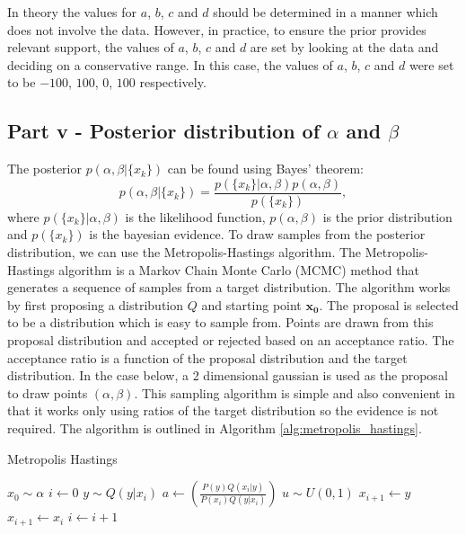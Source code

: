 \documentclass[11pt]{article}
\begin{document}
In theory the values for $a$, $b$, $c$ and $d$ should be determined in a manner which does not involve the data. However, in practice, to ensure the prior provides relevant support, the values of $a$, $b$, $c$ and $d$ are set by looking at the data and deciding on a conservative range. In this case, the values of $a$, $b$, $c$ and $d$ were set to be $-100$, $100$, $0$, $100$ respectively.


\subsection{Part v - Posterior distribution of $\alpha$ and $\beta$}

The posterior $p(\alpha, \beta | \{x_k\})$ can be found using Bayes' theorem:
\[
p(\alpha, \beta | \{x_k\}) = \frac{p(\{x_k\} | \alpha, \beta) p(\alpha, \beta)}{p(\{x_k\})},
\] where $p(\{x_k\} | \alpha, \beta)$ is the likelihood function, $p(\alpha, \beta)$ is the prior distribution and $p(\{x_k\})$ is the bayesian evidence. 
To draw samples from the posterior distribution, we can use the Metropolis-Hastings algorithm. The Metropolis-Hastings algorithm is a Markov Chain Monte Carlo (MCMC)
method that generates a sequence of samples from a target distribution. The algorithm works by first proposing a distribution $Q$ and starting point $\mathbf{x_0}$. The proposal is selected to be a distribution which is easy to sample from. Points are drawn from this proposal distribution and accepted or rejected based on an acceptance ratio. The acceptance ratio is a function of the proposal distribution and the target distribution. In the case below, a 2 dimensional gaussian is used as the proposal to draw points $(\alpha, \beta)$.
This sampling algorithm is simple and also convenient in that it works only using ratios of the target distribution so the evidence is not required. The algorithm is outlined in Algorithm \ref{alg:metropolis_hastings}.

\begin{algorithm}[H]
    \caption{Metropolis Hastings}
    \begin{algorithmic}[1]
    \State $x_0 \sim \alpha$
    \State $i \gets 0$
        \State $y \sim Q(y|x_i)$ 
        \State $a \gets \left(\frac{P(y)Q(x_i|y)}{P(x_i)Q(y|x_i)}\right)$ 
        \State $u \sim U(0,1)$
            \State $x_{i+1} \gets y$ 
        \Else
            \State $x_{i+1} \gets x_i$ 
        \EndIf
        \State $i \gets i + 1$
    \EndWhile
    \end{algorithmic}
    \label{alg:metropolis_hastings}
\end{algorithm}
    
\end{document}
